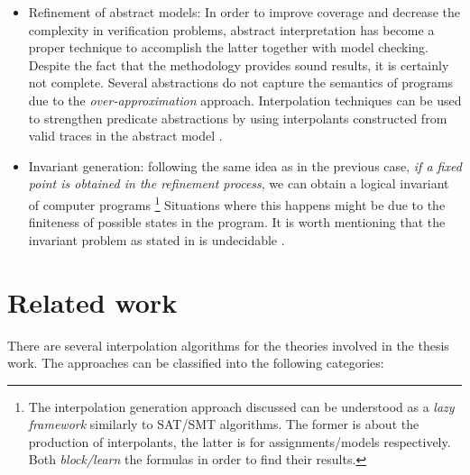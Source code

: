 \begin{itemize}
  \item Refinement of abstract models: In order to improve 
    coverage and decrease the complexity in verification problems,
    abstract interpretation has become a proper technique to 
    accomplish the latter together with model checking. Despite the fact that 
    the methodology provides sound results, it is certainly not complete.
    Several abstractions do not capture the
    semantics of programs due to the \emph{over-approximation} approach.
    Interpolation techniques can be used to strengthen predicate
    abstractions by using interpolants constructed from valid 
    traces in the abstract model \cite{10.1145/876638.876643,
    10.1007/978-3-540-45069-6_1, 10.1145/982962.964021}.
  \item Invariant generation: following the same idea as in the previous
    case, \emph{if a fixed point is obtained in the refinement process},
    we can obtain a logical invariant of computer programs 
    \footnote{The interpolation
      generation approach discussed can be understood as a \emph{lazy framework}
      similarly to SAT/SMT algorithms. The former is
      about the production of interpolants, the latter is for 
      assignments/models respectively. Both \emph{block/learn} the formulas
    in order to find their results.}
    Situations where this happens might be due to the finiteness of possible 
    states in the program. It is worth mentioning that the 
    invariant problem as stated in \cite{10.1145/363235.363259} 
    is undecidable \cite{10.2307/1990888, 10.1145/371282.371285}.
\end{itemize}

\section{Related work}

There are several interpolation algorithms for the theories
involved in the thesis work. The approaches can be classified
into the following categories:

